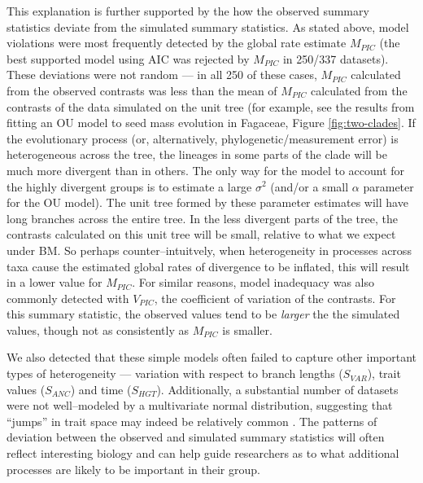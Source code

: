\documentclass[a4paper,12pt]{article}
\begin{document}
This explanation is further supported by the how the observed summary statistics deviate from the simulated summary statistics. As stated above, model violations were most frequently detected by the global rate estimate $M_{PIC}$ (the best supported model using AIC  was rejected by $M_{PIC}$ in 250/337 datasets). These deviations were not random
 --- in all 250 of these cases, $M_{PIC}$ calculated from the observed contrasts was less than the mean of $M_{PIC}$ calculated from the contrasts of the data simulated on the unit tree (for example, see the results from fitting an OU model to seed mass evolution in Fagaceae, Figure \ref{fig:two-clades}. If the evolutionary process (or, alternatively, phylogenetic/measurement error) is heterogeneous across the tree, the lineages in some parts of the clade will be much more divergent than in others. The only way for the model to account for the highly divergent groups is to estimate a large $\sigma^2$ (and/or a small $\alpha$ parameter for the OU model). The unit tree formed by these parameter estimates will have long branches across the entire tree. In the less divergent parts of the tree, the contrasts calculated on this unit tree will be small, relative to what we expect under BM. So perhaps counter--intuitvely, when heterogeneity in processes across taxa cause the estimated global rates of divergence to be inflated, this will result in a lower value for $M_{PIC}$. For similar reasons, model inadequacy was also commonly detected with $V_{PIC}$, the coefficient of variation of the contrasts. For this summary statistic, the observed values tend to be \emph{larger} the the simulated values, though not as consistently as $M_{PIC}$ is smaller. 

We also detected that these simple models often failed to capture other important types of heterogeneity --- variation with respect to branch lengths ($S_{VAR}$), trait values ($S_{ANC}$) and time ($S_{HGT}$). Additionally, a substantial number of datasets were not well--modeled by a multivariate normal distribution, suggesting that ``jumps'' in trait space may indeed be relatively common \citep{Landis2012, PennellPE}. The patterns of deviation between the observed and simulated summary statistics will often reflect interesting biology and can help guide researchers as to what additional processes are likely to be important in their group.
\end{document}
